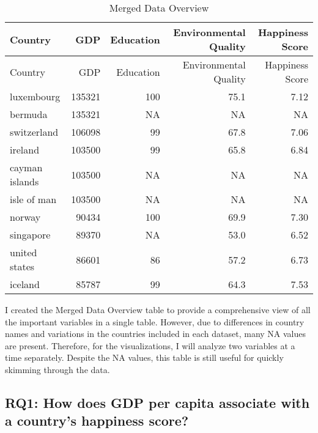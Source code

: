 \documentclass[
]{article}
\begin{document}
\begin{longtable}[]{@{}lrrrr@{}}
\caption{Merged Data Overview}\tabularnewline
\toprule
Country & GDP & Education & Environmental Quality & Happiness Score \\
\midrule
\endfirsthead
\toprule
Country & GDP & Education & Environmental Quality & Happiness Score \\
\midrule
\endhead
luxembourg & 135321 & 100 & 75.1 & 7.12 \\
bermuda & 135321 & NA & NA & NA \\
switzerland & 106098 & 99 & 67.8 & 7.06 \\
ireland & 103500 & 99 & 65.8 & 6.84 \\
cayman islands & 103500 & NA & NA & NA \\
isle of man & 103500 & NA & NA & NA \\
norway & 90434 & 100 & 69.9 & 7.30 \\
singapore & 89370 & NA & 53.0 & 6.52 \\
united states & 86601 & 86 & 57.2 & 6.73 \\
iceland & 85787 & 99 & 64.3 & 7.53 \\
\bottomrule
\end{longtable}

I created the Merged Data Overview table to provide a comprehensive view
of all the important variables in a single table. However, due to
differences in country names and variations in the countries included in
each dataset, many NA values are present. Therefore, for the
visualizations, I will analyze two variables at a time separately.
Despite the NA values, this table is still useful for quickly skimming
through the data.

\hypertarget{rq1-how-does-gdp-per-capita-associate-with-a-countrys-happiness-score}{%
\subsection{RQ1: How does GDP per capita associate with a country's
happiness
score?}\label{rq1-how-does-gdp-per-capita-associate-with-a-countrys-happiness-score}}
\end{document}
